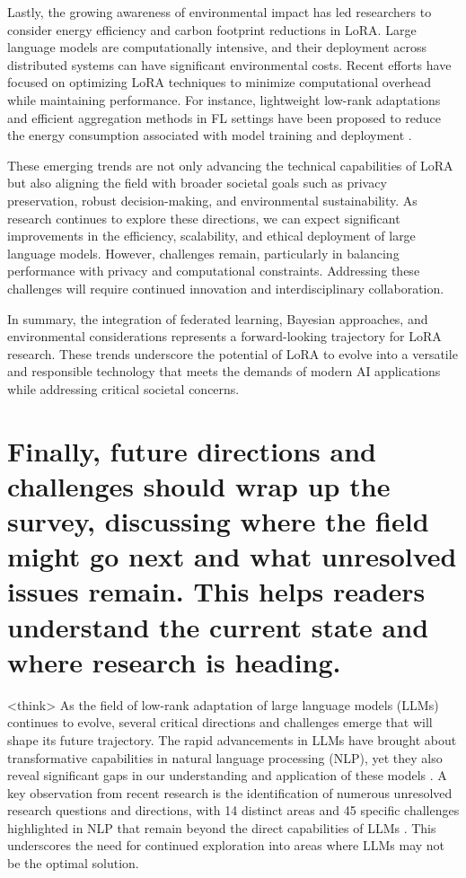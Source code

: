 \documentclass[conference]{IEEEtran}
\begin{document}
Lastly, the growing awareness of environmental impact has led researchers to consider energy efficiency and carbon footprint reductions in LoRA. Large language models are computationally intensive, and their deployment across distributed systems can have significant environmental costs. Recent efforts have focused on optimizing LoRA techniques to minimize computational overhead while maintaining performance. For instance, lightweight low-rank adaptations and efficient aggregation methods in FL settings have been proposed to reduce the energy consumption associated with model training and deployment \cite{b2}.

These emerging trends are not only advancing the technical capabilities of LoRA but also aligning the field with broader societal goals such as privacy preservation, robust decision-making, and environmental sustainability. As research continues to explore these directions, we can expect significant improvements in the efficiency, scalability, and ethical deployment of large language models. However, challenges remain, particularly in balancing performance with privacy and computational constraints. Addressing these challenges will require continued innovation and interdisciplinary collaboration.

In summary, the integration of federated learning, Bayesian approaches, and environmental considerations represents a forward-looking trajectory for LoRA research. These trends underscore the potential of LoRA to evolve into a versatile and responsible technology that meets the demands of modern AI applications while addressing critical societal concerns.

\section{Finally, future directions and challenges should wrap up the survey, discussing where the field might go next and what unresolved issues remain. This helps readers understand the current state and where research is heading.}
<think>
As the field of low-rank adaptation of large language models (LLMs) continues to evolve, several critical directions and challenges emerge that will shape its future trajectory. The rapid advancements in LLMs have brought about transformative capabilities in natural language processing (NLP), yet they also reveal significant gaps in our understanding and application of these models \cite{b1}. A key observation from recent research is the identification of numerous unresolved research questions and directions, with 14 distinct areas and 45 specific challenges highlighted in NLP that remain beyond the direct capabilities of LLMs \cite{b2}. This underscores the need for continued exploration into areas where LLMs may not be the optimal solution.
\end{document}
